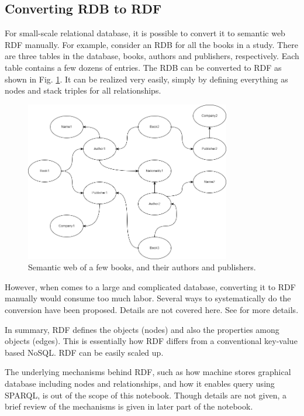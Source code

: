 \subsection{Converting RDB to RDF}

For small-scale relational database, it is possible to convert it to semantic web RDF manually. For example, consider an RDB for all the books in a study. There are three tables in the database, books, authors and publishers, respectively. Each table contains a few dozens of entries. The RDB can be converted to RDF as shown in Fig. \ref{fig:bookexp}. It can be realized very easily, simply by defining everything as nodes and stack triples for all relationships.
\begin{figure}[!htb]
	\centering
	\includegraphics[width=0.8\textwidth]{chapters/part-4/figures/bookexp.png}
	\caption{Semantic web of a few books, and their authors and publishers.}
	\label{fig:bookexp}
\end{figure}

However, when comes to a large and complicated database, converting it to RDF manually would consume too much labor. Several ways to systematically do the conversion have been proposed. Details are not covered here. See \cite{michel2014survey} for more details.

In summary, RDF defines the objects (nodes) and also the properties among objects (edges). This is essentially how RDF differs from a conventional key-value based NoSQL. RDF can be easily scaled up.

The underlying mechanisms behind RDF, such as how machine stores graphical database including nodes and relationships, and how it enables query using SPARQL, is out of the scope of this notebook. Though details are not given, a brief review of the mechanisms is given in later part of the notebook.

